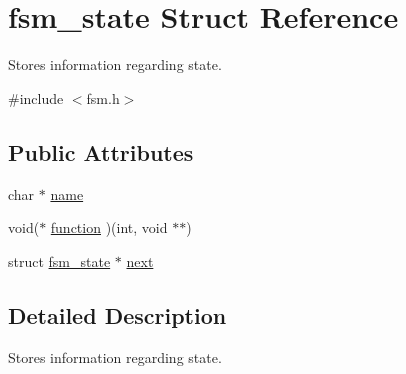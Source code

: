\hypertarget{structfsm__state}{
\section{fsm\_\-state Struct Reference}
\label{structfsm__state}
}


Stores information regarding state.  


{\ttfamily \#include $<$fsm.h$>$}\subsection*{Public Attributes}
\begin{DoxyCompactItemize}
\item 
char $\ast$ \hyperlink{structfsm__state_a440a3e1fb27cc0f14c33b3ce17e46fcc}{name}
\item 
void($\ast$ \hyperlink{structfsm__state_a3610efd3db68ca9d4822540a830a8684}{function} )(int, void $\ast$$\ast$)
\item 
struct \hyperlink{structfsm__state}{fsm\_\-state} $\ast$ \hyperlink{structfsm__state_a9a6566cdfa091b10cb9a68928d7340bb}{next}
\end{DoxyCompactItemize}


\subsection{Detailed Description}
Stores information regarding state. 

